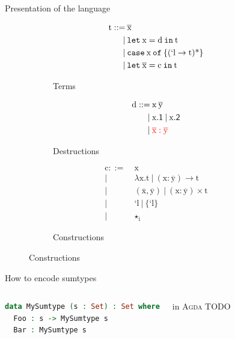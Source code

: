 \documentclass[xcolor=svgnames,11pt]{beamer}
\newcommand{\agda}{\textsc{Agda}\xspace}
\begin{document}
\begin{frame}[shrink]{Presentation of the language}
\begin{figure}[!h]
  \begin{subfigure}[b]{0.3\linewidth{}}
    \begin{align*}
      \ensuremath{\text{t}} ::=\:&\ensuremath{\overline{\text{x}}}\\ |\:&\ensuremath{\text{\texttt{let}}\:\text{x}=\text{d}\:\text{\texttt{in}}\:\text{t}}\\ |\:&\ensuremath{\text{\texttt{case}}\:\text{x}\:\text{\texttt{of}}\:\{\text{\ensuremath{(\text{`l}\to{}\text{t})}\ensuremath{\text{*}}}\}}\\ |\:&\ensuremath{\text{\texttt{let}}\:\overline{\text{x}}=\text{c}\:\text{\texttt{in}}\:\text{t}}
    \end{align*}
    \caption{Terms}
  \end{subfigure}
  \begin{subfigure}[b]{0.25\linewidth{}}
    \begin{align*}
      \ensuremath{\text{d}} ::=\:&\ensuremath{\text{x}} \: \ensuremath{\overline{\text{y}}}\\ |\:&\ensuremath{\text{x}\mathsf{.1}} \: | \: \ensuremath{\text{x}\mathsf{.2}} \\ |\:&\textcolor{red}{\ensuremath{\overline{\text{x}}:\overline{\text{y}}}}
    \end{align*}
    \caption{Destructions}
  \end{subfigure}
  \begin{subfigure}[b]{0.3\linewidth{}}
    \begin{align*}
      \ensuremath{\text{c}} ::=\:&\ensuremath{\text{x}}\\|\:&\ensuremath{\lambda{{}}} \ensuremath{\text{x}} . \ensuremath{\text{t}}\:|\:\ensuremath{(\text{x}:\overline{\text{y}})\to{}\text{t}}\\|\:&(\ensuremath{\overline{\text{x}}},\ensuremath{\overline{\text{y}}})\:|\:\ensuremath{(\text{x}:\overline{\text{y}})\times{}\text{t}}\\|\:&\ensuremath{\text{`l}}\:|\:\ensuremath{\{\text{`l}\}}\\|\:&\ensuremath{\star{}} \ensuremath{_{\text{i}}}
    \end{align*}\caption{Constructions}
  \end{subfigure}
\end{figure}
\end{frame}


\begin{frame}[fragile]{How to encode sumtypes}
\begin{columns}
\begin{lstlisting}[language=Agda]
data MySumtype (s : Set) : Set where
  Foo : s -> MySumtype s
  Bar : MySumtype s
\end{lstlisting}
\centering in \agda
{}
TODO
\end{columns}
\end{frame}
\end{document}
